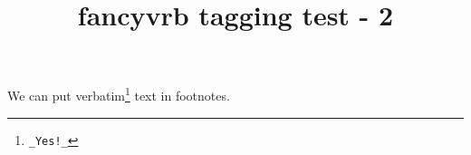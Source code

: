 \documentclass{article}
\title{fancyvrb tagging test - 2}
\begin{document}
\VerbatimFootnotes
We can put verbatim\footnote{\verb+_Yes!_+} text in footnotes.
\end{document}
